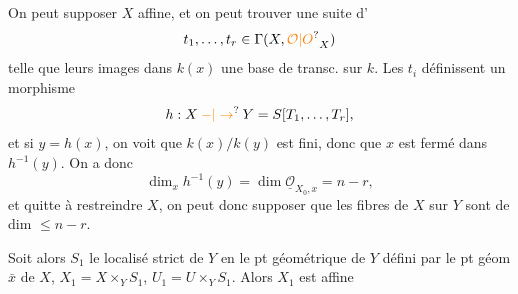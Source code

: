 On peut supposer $X$ affine, et on peut trouver une suite d'
\[
t_1,\ldots,t_r\in\Gamma(X,\unsure{\mathcal O|O}_X)
\]
telle que leurs images dans $k(x)$  une base de transc. sur $k$. Les $t_i$ définissent un morphisme
\[
h:X\mathbin{\unsure{-|\to}}Y=S[T_1,\ldots,T_r],
\]
et si $y=h(x)$, on voit que $k(x)/k(y)$ est fini, donc que $x$ est fermé dans $h^{-1}(y)$. On a donc
\[
\dim_x h^{-1}(y)=\dim\underline{\mathcal O}_{X_0,x}=n-r,
\]
et quitte à restreindre $X$, on peut donc supposer que les fibres de $X$ sur $Y$ sont de dim $\leq n-r$.

Soit alors $S_1$ le localisé strict de $Y$ en le  pt géométrique de $Y$ défini par le pt géom $\bar x$ de $X$, $X_1=X\times_Y S_1$, $U_1=U\times_Y S_1$. Alors $X_1$ est affine


